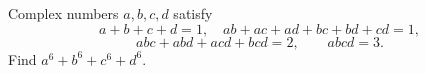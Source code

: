 Complex numbers $a,b,c,d$ satisfy
\[
a+b+c+d=1,\quad ab+ac+ad+bc+bd+cd=1,
\]
\[
abc+abd+acd+bcd=2,\qquad abcd=3.
\]
Find $a^6+b^6+c^6+d^6$.
